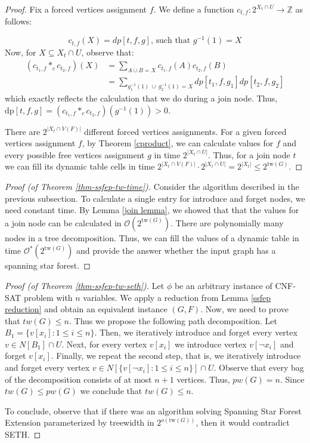 \documentclass[en]{pracamgr}
\theoremstyle{definition}
\newcommand{\ssf}{spanning star forest}
\newcommand{\ssfep}{{\sc Spanning Star Forest Extension}}
\newcommand{\cnfsat}{{\sc CNF-SAT}}
\newcommand{\dpt}[1]{\textrm{dp}[#1]}
\newcommand{\tw}{\textrm{tw}}
\begin{document}
\begin{proof}
	Fix a forced vertices assignment $f$. We define a function $c_{t,f}:2^{X_t \cap U} \rightarrow \mathbb{Z}$ as follows:
	
	\begin{equation*}
		c_{t,f}(X) = dp[t,f,g] \text{, such that $g^{-1}(1) = X$}
	\end{equation*}	
	Now, for $X \subseteq X_t \cap U$, observe that: 
	\begin{align*}
		(c_{t_1,f} *_c c_{t_2,f})(X) &= \sum\limits_{A \cup B = X} c_{t_1,f}(A)c_{t_2,f}(B) \\
		&= \sum\limits_{ g_1^{-1}(1)\ \cup\ g_2^{-1}(1) = X} dp[t_1,f,g_1]dp[t_2,f,g_2]	
	\end{align*}
	which exactly reflects the calculation that we do during a join node. Thus, $\dpt{t,f,g} = (c_{t_1,f} *_c c_{t_2,f})(g^{-1}(1)) > 0$. 
	
	There are $2^{|X_t \cap V(F)|}$ different forced vertices assignments. For a given forced vertices assignment $f$, by Theorem \ref{cproduct}, we can calculate values for $f$ and every possible free vertices assignment $g$ in time $2^{|X_t \cap U|}$. Thus, for a join node $t$ we can fill its dynamic table cells in time $2^{|X_t \cap V(F)|} \cdot 2^{|X_t \cap U|} = 2^{|X_t|} \leq 2^{\tw(G)}$.
\end{proof}

\begin{proof}[Proof (of Theorem \ref{thm-ssfep-tw-time})]
	Consider the algorithm described in the previous subsection. To calculate a single entry for introduce and forget nodes, we need constant time. By Lemma \ref{join lemma}, we showed that that the values for a join node can be calculated in $\mathcal{O}(2^{\tw(G)})$. There are polynomially many nodes in a tree decomposition. Thus, we can fill the values of a dynamic table in time $\mathcal{O}^*(2^{\tw(G)})$ and provide the answer whether the input graph has a \ssf{}.
\end{proof}

\begin{proof}[Proof (of Theorem \ref{thm-ssfep-tw-seth})]
	Let $\phi$ be an arbitrary instance of \cnfsat{} problem with $n$ variables. We apply a reduction from Lemma \ref{ssfep reduction} and obtain an equivalent instance $(G,F)$. Now, we need to prove that $tw(G) \leq n$. Thus we propose the following path decomposition. Let $B_1=\{v[x_i]: 1 \leq i \leq n\}$. Then, we iteratively introduce and forget every vertex $v \in N[B_1] \cap U$. Next, for every vertex $v[x_i]$ we introduce vertex $v[\neg x_i]$ and forget $v[x_i]$. Finally, we repeat the second step, that is, we iteratively introduce and forget every vertex $v \in N[\{v[\neg x_i]: 1 \leq i \leq n\}] \cap U$. Observe that every bag of the decomposition consists of at most $n+1$ vertices. Thus, $pw(G)=n$. Since $tw(G) \leq pw(G)$ we conclude that $tw(G) \leq n$.
	
	To conclude, observe that if there was an algorithm solving \ssfep{} parameterized by treewidth in $2^{o(
		 \tw(G))}$, then it would contradict SETH.
\end{proof}
\end{document}
